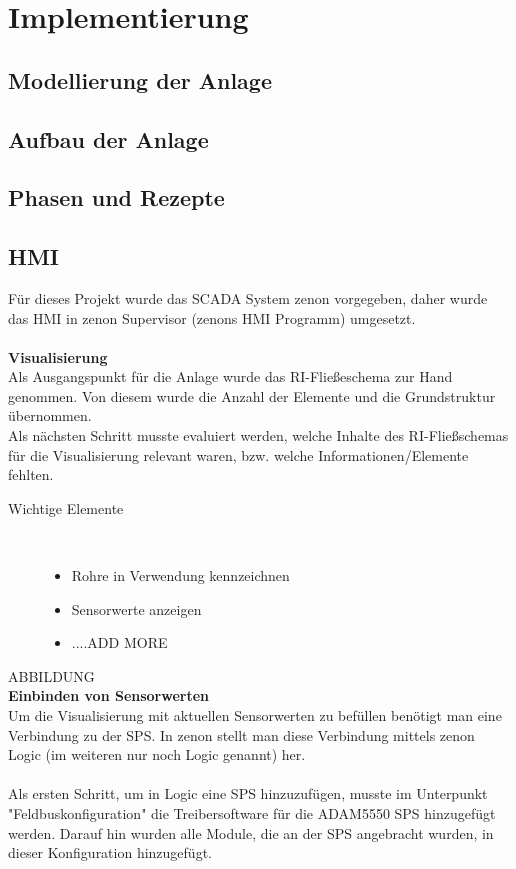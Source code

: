 \chapter{Implementierung} \label{chapter:thevetestcase}
\section{Modellierung der Anlage}
\section{Aufbau der Anlage}
\section{Phasen und Rezepte}
\section{HMI}
Für dieses Projekt wurde das SCADA System zenon vorgegeben, daher wurde das HMI in zenon Supervisor (zenons HMI Programm) umgesetzt.\\
\\
\textbf{Visualisierung}\\
Als Ausgangspunkt für die Anlage wurde das RI-Fließeschema zur Hand genommen. Von diesem wurde die Anzahl der Elemente und die Grundstruktur übernommen.\\
Als nächsten Schritt musste evaluiert werden, welche Inhalte des RI-Fließschemas für die Visualisierung relevant waren, bzw. welche Informationen/Elemente fehlten.
\begin{description}
\item[Wichtige Elemente]~\par
	\begin{itemize}
		\item Rohre in Verwendung kennzeichnen
		\item Sensorwerte anzeigen
		\item ....ADD MORE
	\end{itemize}
\end{description}
ABBILDUNG\\

\textbf{Einbinden von Sensorwerten}\\
Um die Visualisierung mit aktuellen Sensorwerten zu befüllen benötigt man eine Verbindung zu der SPS. In zenon stellt man diese Verbindung mittels zenon Logic (im weiteren nur noch Logic genannt) her.\\
\\
Als ersten Schritt, um in Logic eine SPS hinzuzufügen, musste im Unterpunkt "Feldbuskonfiguration" die Treibersoftware für die ADAM5550 SPS hinzugefügt werden. Darauf hin wurden alle Module, die an der SPS angebracht wurden, in dieser Konfiguration hinzugefügt. 

